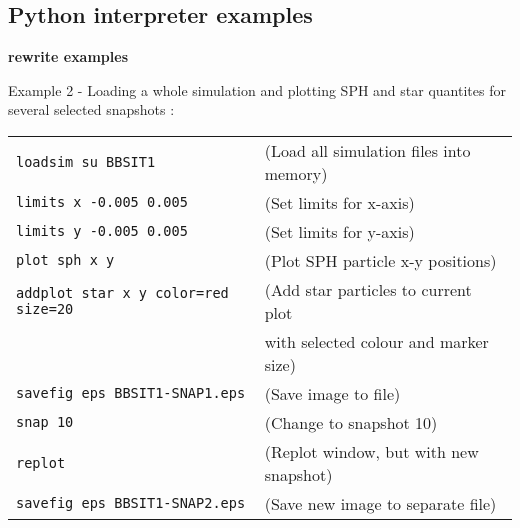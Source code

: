 \documentclass[a4paper]{article}
\newcommand{\var}[1]{\texttt{#1}}
\begin{document}
\subsection{Python interpreter examples}

\textbf{rewrite examples}

%
%


\noindent Example 2 - Loading a whole simulation and plotting SPH and star quantites for several selected snapshots : \\

\begin{tabular}{p{7cm}p{6cm}}
\var{loadsim su BBSIT1} &              (Load all simulation files into memory) \\
\var{limits x -0.005 0.005} &          (Set limits for x-axis) \\
\var{limits y -0.005 0.005} &         (Set limits for y-axis) \\
\var{plot sph x y} &                   (Plot SPH particle x-y positions) \\
\var{addplot star x y color=red size=20} & (Add star particles to current plot \\
                                        & with selected colour and marker size) \\
\var{savefig eps BBSIT1-SNAP1.eps} &   (Save image to file) \\
\var{snap 10}                      &   (Change to snapshot 10) \\
\var{replot}                       &   (Replot window, but with new snapshot)\\
\var{savefig eps BBSIT1-SNAP2.eps} &   (Save new image to separate file)
\end{tabular}
\newline
\end{document}
